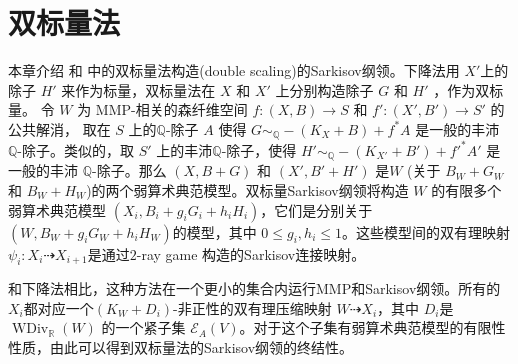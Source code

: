 \chapter{双标量法}
 本章介绍\cite[\S 13]{haconMinimalModelProgram2012} 和  \cite{liuSarkisovProgramGeneralized2021}中的双标量法构造(double scaling)的Sarkisov纲领。下降法用 $X'$上的除子 $H'$ 来作为标量，双标量法在  $X$ 和 $X'$ 上分别构造除子 $G$ 和 $H'$ ，作为双标量。
令 $W$ 为 MMP-相关的森纤维空间 $f:(X,B)\to S$ 和 $f':(X',B')\to S'$  的公共解消，  取在 $S$ 上的$\mathbb{Q}$-除子 $A$ 使得 $G \sim_\mathbb{Q} -(K_{X}+B) +f^*A$ 是一般的丰沛 $\mathbb{Q}$-除子。类似的，取 $S'$ 上的丰沛$\mathbb{Q}$-除子，使得 $H' \sim_\mathbb{Q} -(K_{X'}+B') +f'^*A'$ 是一般的丰沛 $\mathbb{Q}$-除子。那么  $(X,B+G)$ 和 $(X',B'+H')$  是$W$ (关于 $B_{W}+G_{W}$ 和 $B_{W}+H_{W}$)的两个弱算术典范模型。双标量Sarkisov纲领将构造 $W$ 的有限多个弱算术典范模型 $(X_{i},B_{i}+g_{i}G_{i}+h_{i}H_{i})$，它们是分别关于 $(W,B_{W}+g_{i}G_{W}+h_{i}H_{W})$的模型，其中 $0\leqslant g_i,h_i\leqslant 1$。这些模型间的双有理映射 $\psi_{i}:X_{i}\dashrightarrow X_{i+1}$是通过$2$-ray game 构造的Sarkisov连接映射。

和下降法相比，这种方法在一个更小的集合内运行MMP和Sarkisov纲领。所有的 $X_{i}$都对应一个$(K_{W}+D_{i})$-非正性的双有理压缩映射 $W\dashrightarrow X_{i}$，其中 $D_{i}$是 $\operatorname{WDiv}_{\mathbb{R}}(W)$ 的一个紧子集 $\mathcal{E}_{A}(V)$。对于这个子集有弱算术典范模型的有限性性质，由此可以得到双标量法的Sarkisov纲领的终结性。
